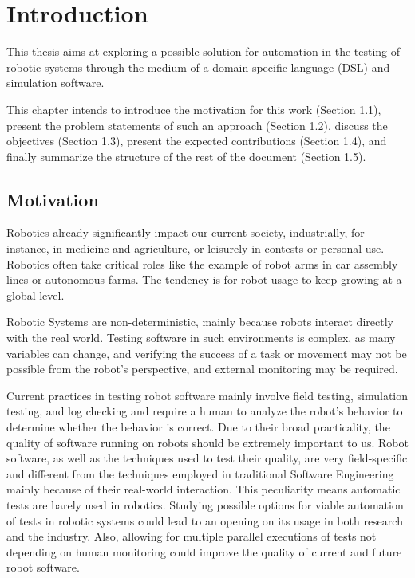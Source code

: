 \chapter{Introduction}
\label{chap:introduction}

This thesis aims at exploring a possible solution for automation in the testing of robotic systems through the medium of a domain-specific language (DSL) and simulation software.

This chapter intends to introduce the motivation for this work (Section 1.1), present the problem statements of such an approach (Section 1.2), discuss the objectives (Section 1.3), present the expected contributions (Section 1.4), and finally summarize the structure of the rest of the document (Section 1.5).


\section{Motivation}
\label{sec:motivation}

Robotics already significantly impact our current society, industrially, for instance, in medicine and agriculture, or leisurely in contests or personal use. Robotics often take critical roles like the example of robot arms in car assembly lines or autonomous farms. The tendency is for robot usage to keep growing at a global level. 

Robotic Systems are non-deterministic, mainly because robots interact directly with the real world. Testing software in such environments is complex, as many variables can change, and verifying the success of a task or movement may not be possible from the robot's perspective, and external monitoring may be required.

Current practices in testing robot software mainly involve field testing, simulation testing, and log checking and require a human to analyze the robot's behavior to determine whether the behavior is correct. Due to their broad practicality, the quality of software running on robots should be extremely important to us. Robot software, as well as the techniques used to test their quality, are very field-specific and different from the techniques employed in traditional Software Engineering mainly because of their real-world interaction. This peculiarity means automatic tests are barely used in robotics. Studying possible options for viable automation of tests in robotic systems could lead to an opening on its usage in both research and the industry. Also, allowing for multiple parallel executions of tests not depending on human monitoring could improve the quality of current and future robot software.


